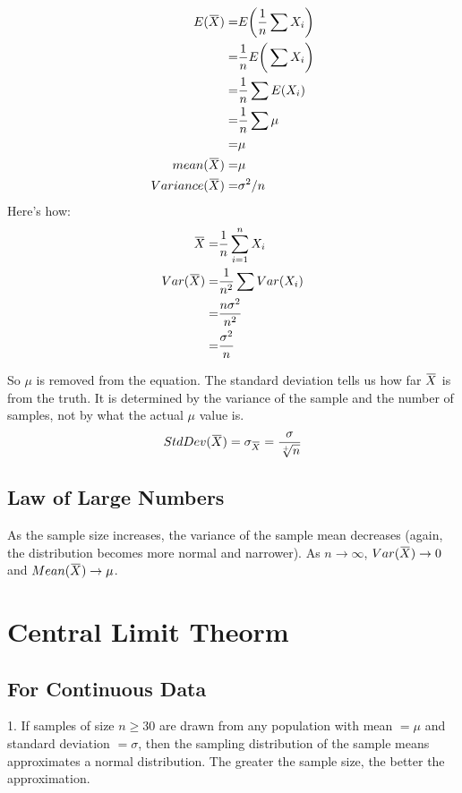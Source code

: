 \documentclass[11pt, oneside]{article}   	%
\newcommand{\overbar}[1]{\mkern 1.5mu\overline{\mkern-1.5mu#1\mkern-1.5mu}\mkern 1.5mu}
\begin{document}
\begin{align*}
E(\overbar{X}) =& E\bigg(\frac{1}{n} \sum X_i  \bigg) \\
 =& \frac{1}{n}E\bigg(\sum X_i \bigg) \\
 =& \frac{1}{n}\sum E(X_i)\\
 =& \frac{1}{n}\sum \mu \\
 =& \mu \\
mean(\overbar{X}) =& \mu \\
Variance(\overbar{X}) =& \sigma^2 / n \\
\end{align*}
Here's how:
\begin{align*}
\overbar{X} = & \frac{1}{n}\sum \limits_{i=1}^{n} X_i \\
Var(\overbar{X}) =& \frac{1}{n^2} \sum Var(X_i) \\
	=& \frac{n\sigma^2}{n^2} \\
	=& \frac{\sigma^2}{n}
\end{align*}

So $\mu$ is removed from the equation.  The standard deviation tells us how far $\overbar{X}$ is from the truth. It is determined by the variance of the sample and the number of samples, not by what the actual $\mu$ value is.
\[
StdDev(\overbar{X}) = \sigma_{\overbar{X}} = \frac{\sigma}{\sqrt[+]{n}}
\]

\subsection{Law of Large Numbers}

As the sample size increases, the variance of the sample mean decreases (again, the distribution becomes more normal and narrower). As $n \rightarrow \infty$, $Var(\overbar{X}) \rightarrow 0$ and $Mean(\overbar{X}) \rightarrow \mu$. 


\section{Central Limit Theorm}

\subsection{For Continuous Data}

1. If samples of size $n \geq 30$ are drawn from any population with mean $= \mu$ and standard deviation $= \sigma$, then the sampling distribution of the sample means approximates a normal distribution. The greater the sample size, the better the approximation.
\end{document}
